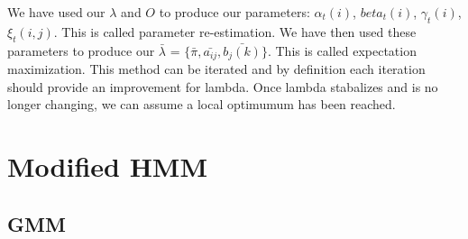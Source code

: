 We have used our $\lambda$ and $O$ to produce our parameters: $\alpha_t(i)$, $beta_t(i)$, $\gamma_t(i)$, $\xi_t(i,j)$. This is called parameter re-estimation. We have then used these parameters to produce our $\bar{\lambda}$ = $\{\bar{\pi}, \bar{a_{ij}}, \bar{b_j(k)} \}$. This is called expectation maximization. This method can be iterated and by definition each iteration should provide an improvement for lambda. Once lambda stabalizes and is no longer changing, we can assume a local optimumum has been reached. 



\section{Modified HMM}
\subsection{GMM}




